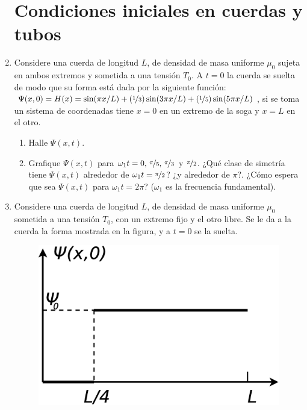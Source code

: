 \documentclass[11pt,spanish]{article}
\begin{document}
\begin{enumerate}
\section*{Condiciones iniciales en cuerdas y tubos}


    \item Considere una cuerda de longitud $L$, de densidad de masa uniforme
    $\mu_{0}$ sujeta en ambos extremos y sometida a una tensión $T_{0}$. A $t=0$
    la cuerda se suelta de modo que su forma está dada por la siguiente función:
    $\Psi(x,0)=H(x)=\sin(\pi x/L)+(\nicefrac{1}{3})\sin(3\pi x/L)+(\nicefrac{1}{5})\sin(5\pi x/L)$,
    si se toma un sistema de coordenadas tiene $x=0$ en un extremo de la soga y
    $x=L$ en el otro. 

    \begin{enumerate}
        \item Halle $\Psi(x,t)$.

        \item Grafique $\Psi(x,t)$ para $\omega_{1}t=0,\,\nicefrac{\pi}{5},\,\nicefrac{\pi}{3}$
        y $\nicefrac{\pi}{2}$. ¿Qué clase de simetría tiene $\Psi(x,t)$ 
        alrededor de $\omega_{1}t=\nicefrac{\pi}{2}$? ¿y alrededor de $\pi$?.
        ¿Cómo espera que sea $\Psi(x,t)$ para $\omega_{1}t=2\pi$? ($\omega_{1}$
        es la frecuencia fundamental).
    \end{enumerate}


    \item Considere una cuerda de longitud $L$, de densidad de masa uniforme
    $\mu_{0}$ sometida a una tensión $T_{0}$, con un extremo fijo y el otro
    libre. Se le da a la cuerda la forma mostrada en la figura, y a $t=0$ se la
    suelta.

    \begin{figure}[H]
        \centering{}\includegraphics[clip,scale=0.25]{figs/ej1-25}
    \end{figure}


\end{enumerate}
\end{document}
